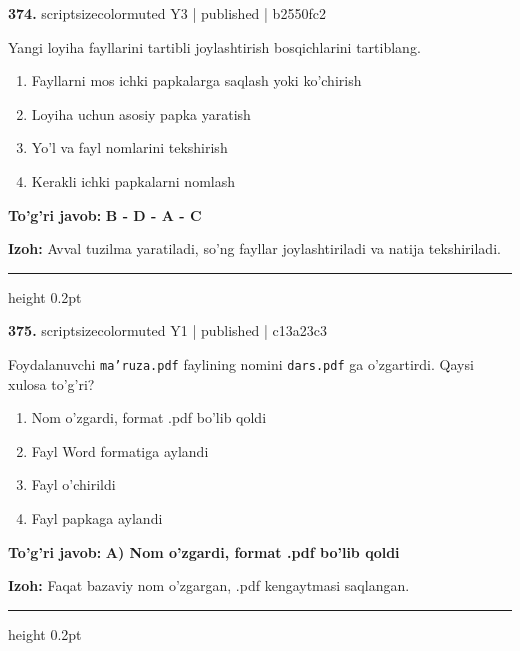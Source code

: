 \documentclass[10pt,a4paper]{article}
\begin{document}
{\bfseries\sffamily\color{ink} 374.} {scriptsizecolor{muted} Y3 | published | b2550fc2}
\par
Yangi loyiha fayllarini tartibli joylashtirish bosqichlarini tartiblang.
\begin{enumerate}[label=\Alph*),leftmargin=9mm]
\item Fayllarni mos ichki papkalarga saqlash yoki ko'chirish
\item Loyiha uchun asosiy papka yaratish
\item Yo'l va fayl nomlarini tekshirish
\item Kerakli ichki papkalarni nomlash
\end{enumerate}
\begin{tcolorbox}[enhanced,breakable,colback=teal!4,colframe=teal!60!black,boxrule=0.45pt,arc=1.2mm,left=2.7mm,right=2.7mm,top=1.8mm,bottom=1.8mm,before skip=2mm,after skip=2mm]
{\bfseries\sffamily\color{teal}To'g'ri javob:} \textbf{B - D - A - C}
\par\smallskip
{\bfseries Izoh:} Avval tuzilma yaratiladi, so'ng fayllar joylashtiriladi va natija tekshiriladi.
\end{tcolorbox}
\vspace{2mm}\hrule height 0.2pt\vspace{3mm}

{\bfseries\sffamily\color{ink} 375.} {scriptsizecolor{muted} Y1 | published | c13a23c3}
\par
Foydalanuvchi \texttt{ma'ruza.pdf} faylining nomini \texttt{dars.pdf} ga o'zgartirdi. Qaysi xulosa to'g'ri?
\begin{enumerate}[label=\Alph*),leftmargin=9mm]
\item Nom o'zgardi, format .pdf bo'lib qoldi
\item Fayl Word formatiga aylandi
\item Fayl o'chirildi
\item Fayl papkaga aylandi
\end{enumerate}
\begin{tcolorbox}[enhanced,breakable,colback=teal!4,colframe=teal!60!black,boxrule=0.45pt,arc=1.2mm,left=2.7mm,right=2.7mm,top=1.8mm,bottom=1.8mm,before skip=2mm,after skip=2mm]
{\bfseries\sffamily\color{teal}To'g'ri javob:} \textbf{A) Nom o'zgardi, format .pdf bo'lib qoldi}
\par\smallskip
{\bfseries Izoh:} Faqat bazaviy nom o'zgargan, .pdf kengaytmasi saqlangan.
\end{tcolorbox}
\vspace{2mm}\hrule height 0.2pt\vspace{3mm}
\end{document}
